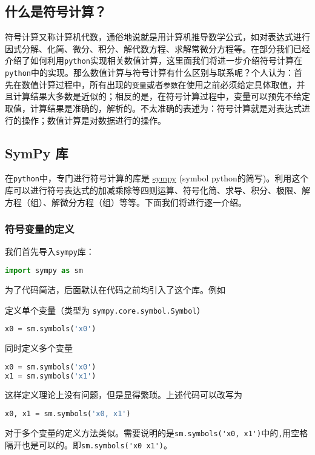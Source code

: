 
\subsection{什么是符号计算？}
符号计算又称计算机代数，通俗地说就是用计算机推导数学公式，如对表达式进行因式分解、化简、微分、积分、解代数方程、求解常微分方程等。在部分我们已经介绍了如何利用\verb|python|实现相关数值计算，这里面我们将进一步介绍符号计算在\verb|python|中的实现。那么数值计算与符号计算有什么区别与联系呢？个人认为：首先在数值计算过程中，所有出现的\verb|变量|或者\verb|参数|在使用之前必须给定具体取值，并且计算结果大多数是近似的；相反的是，在符号计算过程中，变量可以预先不给定取值，计算结果是准确的，解析的。不太准确的表述为：符号计算就是对表达式进行的操作；数值计算是对数据进行的操作。

\subsection{SymPy 库}
在\verb|python|中，专门进行符号计算的库是 \href{https://www.sympy.org/en/index.html}{sympy} (symbol python的简写)。利用这个库可以进行符号表达式的加减乘除等四则运算、符号化简、求导、积分、极限、解方程（组）、解微分方程（组）等等。下面我们将进行逐一介绍。

\subsubsection{符号变量的定义}
我们首先导入\verb|sympy|库：
\begin{lstlisting}[language=python]
import sympy as sm
\end{lstlisting}
为了代码简洁，后面默认在代码之前均引入了这个库。例如

定义单个变量（类型为 \verb|sympy.core.symbol.Symbol|）
\begin{lstlisting}[language=python]
x0 = sm.symbols('x0')
\end{lstlisting}
同时定义多个变量
\begin{lstlisting}[language=python]
x0 = sm.symbols('x0')
x1 = sm.symbols('x1')
\end{lstlisting}
这样定义理论上没有问题，但是显得繁琐。上述代码可以改写为
\begin{lstlisting}[language=python]
x0, x1 = sm.symbols('x0, x1')
\end{lstlisting}
对于多个变量的定义方法类似。需要说明的是\verb|sm.symbols('x0, x1')|中的\verb|,|用空格隔开也是可以的。即\verb|sm.symbols('x0 x1')|。

